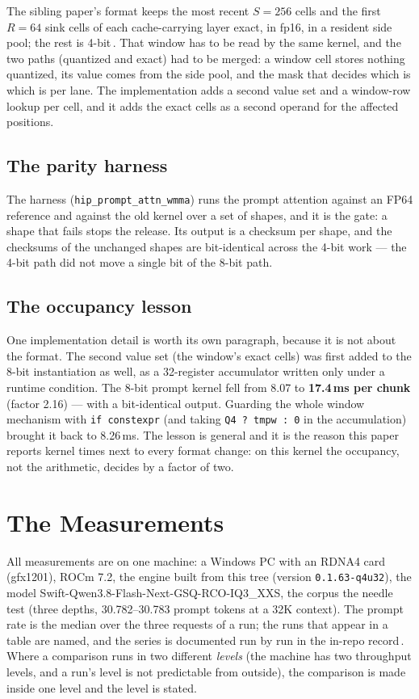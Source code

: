 \documentclass[10pt,twocolumn]{article}
\begin{document}
The sibling paper's format keeps the most recent $S{=}256$ cells and the first $R{=}64$ sink cells of each
cache-carrying layer exact, in fp16, in a resident side pool; the rest is 4-bit\,\cite{kvwin}. That window
has to be read by the same kernel, and the two paths (quantized and exact) had to be merged: a window cell
stores nothing quantized, its value comes from the side pool, and the mask that decides which is which is
per lane. The implementation adds a second value set and a window-row lookup per cell, and it adds the
exact cells as a second operand for the affected positions.

\subsection{The parity harness}

The harness (\texttt{hip\_prompt\_attn\_wmma}) runs the prompt attention against an FP64 reference and
against the old kernel over a set of shapes, and it is the gate: a shape that fails stops the release. Its
output is a checksum per shape, and the checksums of the unchanged shapes are bit-identical across the
4-bit work --- the 4-bit path did not move a single bit of the 8-bit path.

\subsection{The occupancy lesson}
\label{sec:occupancy}

One implementation detail is worth its own paragraph, because it is not about the format. The second value
set (the window's exact cells) was first added to the 8-bit instantiation as well, as a 32-register
accumulator written only under a runtime condition. The 8-bit prompt kernel fell from 8.07 to \textbf{17.4\,ms
per chunk} (factor 2.16) --- with a bit-identical output. Guarding the whole window mechanism with
\texttt{if constexpr} (and taking \texttt{Q4 ? tmpw : 0} in the accumulation) brought it back to 8.26\,ms.
The lesson is general and it is the reason this paper reports kernel times next to every format change: on
this kernel the occupancy, not the arithmetic, decides by a factor of two.

\section{The Measurements}
\label{sec:meas}

All measurements are on one machine: a Windows PC with an RDNA4 card (gfx1201), ROCm 7.2, the engine built
from this tree (version \texttt{0.1.63-q4u32}), the model Swift-Qwen3.8-Flash-Next-GSQ-RCO-IQ3\_XXS,
the corpus the needle test (three depths, 30.782--30.783 prompt tokens at a 32K context). The prompt rate is
the median over the three requests of a run; the runs that appear in a table are named, and the series is
documented run by run in the in-repo record\,\cite{fastpath}. Where a comparison runs in two different
\emph{levels} (the machine has two throughput levels, and a run's level is not predictable from outside),
the comparison is made inside one level and the level is stated.
\end{document}
